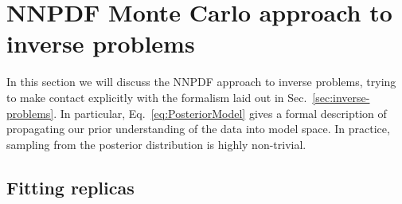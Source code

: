 \section{NNPDF Monte Carlo approach to inverse problems}
\label{sec:closure-test}

In this section we will discuss the NNPDF approach to inverse problems, trying
to make contact explicitly with the formalism laid out in
Sec.~\ref{sec:inverse-problems}. In particular, Eq.~\eqref{eq:PosteriorModel}
gives a formal description of propagating our prior understanding of the data
into model space. In practice, sampling from the posterior distribution is
highly non-trivial.

\subsection{Fitting replicas}
\label{sec:fit-reps}

